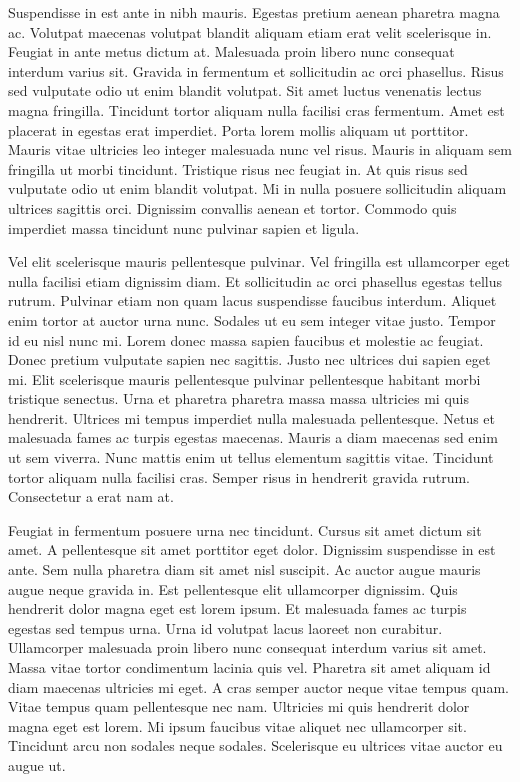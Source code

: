 \documentclass[12pt]{article}
\begin{document}
Suspendisse in est ante in nibh mauris. Egestas pretium aenean pharetra magna ac. Volutpat maecenas volutpat blandit aliquam etiam erat velit scelerisque in. Feugiat in ante metus dictum at. Malesuada proin libero nunc consequat interdum varius sit. Gravida in fermentum et sollicitudin ac orci phasellus. Risus sed vulputate odio ut enim blandit volutpat. Sit amet luctus venenatis lectus magna fringilla. Tincidunt tortor aliquam nulla facilisi cras fermentum. Amet est placerat in egestas erat imperdiet. Porta lorem mollis aliquam ut porttitor. Mauris vitae ultricies leo integer malesuada nunc vel risus. Mauris in aliquam sem fringilla ut morbi tincidunt. Tristique risus nec feugiat in. At quis risus sed vulputate odio ut enim blandit volutpat. Mi in nulla posuere sollicitudin aliquam ultrices sagittis orci. Dignissim convallis aenean et tortor. Commodo quis imperdiet massa tincidunt nunc pulvinar sapien et ligula.

Vel elit scelerisque mauris pellentesque pulvinar. Vel fringilla est ullamcorper eget nulla facilisi etiam dignissim diam. Et sollicitudin ac orci phasellus egestas tellus rutrum. Pulvinar etiam non quam lacus suspendisse faucibus interdum. Aliquet enim tortor at auctor urna nunc. Sodales ut eu sem integer vitae justo. Tempor id eu nisl nunc mi. Lorem donec massa sapien faucibus et molestie ac feugiat. Donec pretium vulputate sapien nec sagittis. Justo nec ultrices dui sapien eget mi. Elit scelerisque mauris pellentesque pulvinar pellentesque habitant morbi tristique senectus. Urna et pharetra pharetra massa massa ultricies mi quis hendrerit. Ultrices mi tempus imperdiet nulla malesuada pellentesque. Netus et malesuada fames ac turpis egestas maecenas. Mauris a diam maecenas sed enim ut sem viverra. Nunc mattis enim ut tellus elementum sagittis vitae. Tincidunt tortor aliquam nulla facilisi cras. Semper risus in hendrerit gravida rutrum. Consectetur a erat nam at.

Feugiat in fermentum posuere urna nec tincidunt. Cursus sit amet dictum sit amet. A pellentesque sit amet porttitor eget dolor. Dignissim suspendisse in est ante. Sem nulla pharetra diam sit amet nisl suscipit. Ac auctor augue mauris augue neque gravida in. Est pellentesque elit ullamcorper dignissim. Quis hendrerit dolor magna eget est lorem ipsum. Et malesuada fames ac turpis egestas sed tempus urna. Urna id volutpat lacus laoreet non curabitur. Ullamcorper malesuada proin libero nunc consequat interdum varius sit amet. Massa vitae tortor condimentum lacinia quis vel. Pharetra sit amet aliquam id diam maecenas ultricies mi eget. A cras semper auctor neque vitae tempus quam. Vitae tempus quam pellentesque nec nam. Ultricies mi quis hendrerit dolor magna eget est lorem. Mi ipsum faucibus vitae aliquet nec ullamcorper sit. Tincidunt arcu non sodales neque sodales. Scelerisque eu ultrices vitae auctor eu augue ut.
\end{document}
